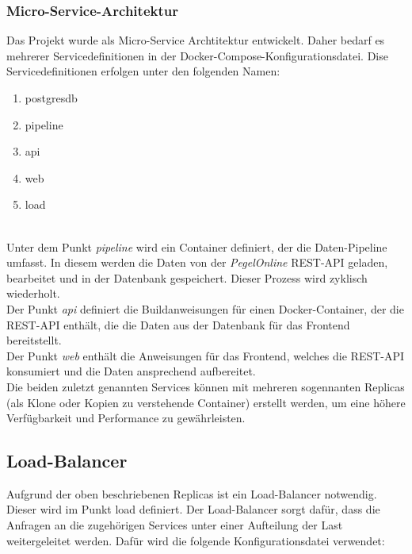 \subsubsection{Micro-Service-Architektur}
Das Projekt wurde als Micro-Service Archtitektur entwickelt. Daher bedarf es mehrerer Servicedefinitionen in der Docker-Compose-Konfigurationsdatei. Dise Servicedefinitionen erfolgen unter den folgenden Namen:
\begin{enumerate}
    \item postgresdb
    \item pipeline
    \item api
    \item web
    \item load
\end{enumerate}~\\
Unter dem Punkt \textit{pipeline} wird ein Container definiert, der die Daten-Pipeline umfasst. 
In diesem werden die Daten von der \textit{PegelOnline} REST-API geladen, bearbeitet und in der Datenbank gespeichert. 
Dieser Prozess wird zyklisch wiederholt.\\
Der Punkt \textit{api} definiert die Buildanweisungen für einen Docker-Container, der die REST-API enthält, die die Daten aus der Datenbank für das Frontend bereitstellt. \\
Der Punkt \textit{web} enthält die Anweisungen für das Frontend, welches die REST-API konsumiert und die Daten ansprechend aufbereitet.\\
Die beiden zuletzt genannten Services können mit mehreren sogennanten Replicas (als Klone oder Kopien zu verstehende Container) erstellt 
werden, um eine höhere Verfügbarkeit und Performance zu gewährleisten. \\

\subsection{Load-Balancer}
Aufgrund der oben beschriebenen Replicas ist ein Load-Balancer notwendig. Dieser wird im Punkt load definiert.
Der Load-Balancer sorgt dafür, dass die Anfragen an die zugehörigen Services unter einer Aufteilung der Last weitergeleitet werden. 
Dafür wird die folgende Konfigurationsdatei verwendet:\\

